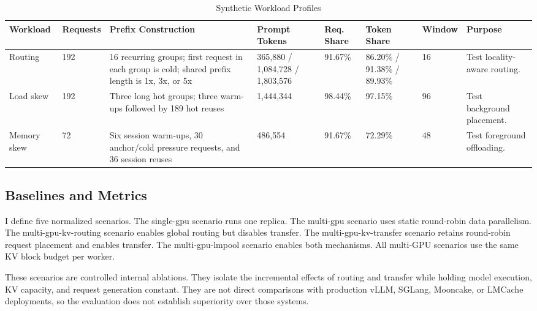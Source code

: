 \documentclass{article}
\begin{document}
\begin{table}[t]
  \centering
  \caption{Synthetic Workload Profiles}
  \label{tab:datasets}
  \scriptsize
  \setlength{\tabcolsep}{2pt}
  \renewcommand{\arraystretch}{1.08}
  \begin{tabular}{@{}L{0.08\textwidth}L{0.06\textwidth}L{0.22\textwidth}L{0.10\textwidth}L{0.07\textwidth}L{0.10\textwidth}L{0.05\textwidth}L{0.16\textwidth}@{}}
    \toprule
    Workload & Requests & Prefix Construction & Prompt Tokens & Req. Share & Token Share & Window & Purpose \\
    \midrule
    Routing & 192 & 16 recurring groups; first request in each group is cold; shared prefix length is 1x, 3x, or 5x & 365,880 / 1,084,728 / 1,803,576 & 91.67\% & 86.20\% / 91.38\% / 89.93\% & 16 & Test locality-aware routing. \\
    Load skew & 192 & Three long hot groups; three warm-ups followed by 189 hot reuses & 1,444,344 & 98.44\% & 97.15\% & 96 & Test background placement. \\
    Memory skew & 72 & Six session warm-ups, 30 anchor/cold pressure requests, and 36 session reuses & 486,554 & 91.67\% & 72.29\% & 48 & Test foreground offloading. \\
    \bottomrule
  \end{tabular}
\end{table}

\subsection{Baselines and Metrics}

I define five normalized scenarios. The single-gpu scenario runs one replica. The multi-gpu scenario uses static round-robin data parallelism. The multi-gpu-kv-routing scenario enables global routing but disables transfer. The multi-gpu-kv-transfer scenario retains round-robin request placement and enables transfer. The multi-gpu-lmpool scenario enables both mechanisms. All multi-GPU scenarios use the same KV block budget per worker.

These scenarios are controlled internal ablations. They isolate the incremental effects of routing and transfer while holding model execution, KV capacity, and request generation constant. They are not direct comparisons with production vLLM, SGLang, Mooncake, or LMCache deployments, so the evaluation does not establish superiority over those systems.
\end{document}
